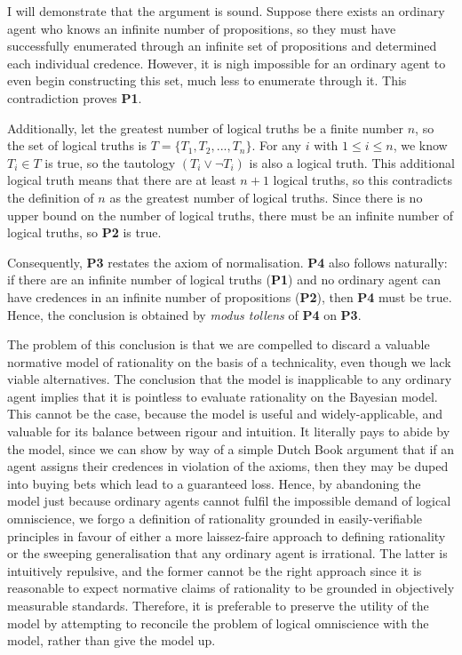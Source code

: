 \documentclass[12pt]{article}
\begin{document}
I will demonstrate that the argument is sound. Suppose there exists an ordinary agent who knows an infinite number of propositions, so they must have successfully enumerated through an infinite set of propositions and determined each individual credence. However, it is nigh impossible for an ordinary agent to even begin constructing this set, much less to enumerate through it. This contradiction proves \textbf{P1}.

Additionally, let the greatest number of logical truths be a finite number $n$, so the set of logical truths is $T=\{T_1,T_2,...,T_n\}$. For any $i$ with $1\leq i\leq n$, we know $T_i\in T$ is true, so the tautology $(T_i\lor\lnot T_i)$ is also a logical truth. This additional logical truth means that there are at least $n+1$ logical truths, so this contradicts the definition of $n$ as the greatest number of logical truths. Since there is no upper bound on the number of logical truths, there must be an infinite number of logical truths, so \textbf{P2} is true.

Consequently, \textbf{P3} restates the axiom of normalisation. \textbf{P4} also follows naturally: if there are an infinite number of logical truths (\textbf{P1}) and no ordinary agent can have credences in an infinite number of propositions (\textbf{P2}), then \textbf{P4} must be true. Hence, the conclusion is obtained by \textit{modus tollens} of \textbf{P4} on \textbf{P3}.

The problem of this conclusion is that we are compelled to discard a valuable normative model of rationality on the basis of a technicality, even though we lack viable alternatives. The conclusion that the model is inapplicable to any ordinary agent implies that it is pointless to evaluate rationality on the Bayesian model. This cannot be the case, because the model is useful and widely-applicable, and valuable for its balance between rigour and intuition. It literally pays to abide by the model, since we can show by way of a simple Dutch Book argument that if an agent assigns their credences in violation of the axioms, then they may be duped into buying bets which lead to a guaranteed loss.\autocite[44]{bdrc} Hence, by abandoning the model just because ordinary agents cannot fulfil the impossible demand of logical omniscience, we forgo a definition of rationality grounded in easily-verifiable principles in favour of either a more laissez-faire approach to defining rationality or the sweeping generalisation that any ordinary agent is irrational. The latter is intuitively repulsive, and the former cannot be the right approach since it is reasonable to expect normative claims of rationality to be grounded in objectively measurable standards. Therefore, it is preferable to preserve the utility of the model by attempting to reconcile the problem of logical omniscience with the model, rather than give the model up.
\end{document}

